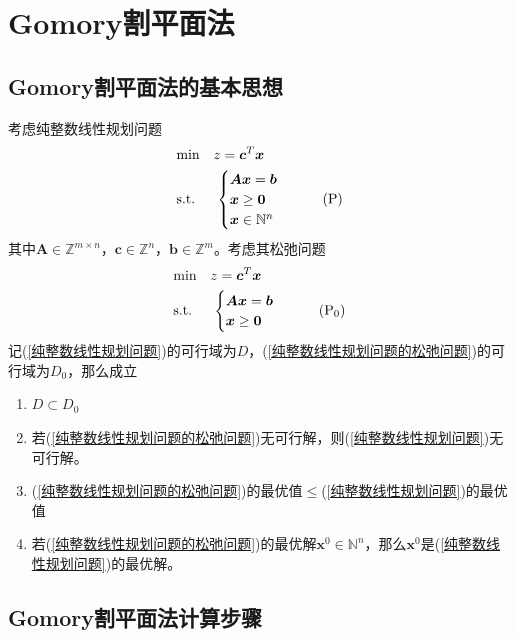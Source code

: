 \documentclass[lang = cn, scheme = chinese, thmcnt = section]{elegantbook}
\newcommand{\N}{\mathbb{N}}            %
\newcommand{\Z}{\mathbb{Z}}            %
\newcommand{\sub}{\subset}             %
\newcommand{\bs}{\boldsymbol}          %
\begin{document}
\section{Gomory割平面法}

\subsection{Gomory割平面法的基本思想}

考虑纯整数线性规划问题
\begin{align*}\label{纯整数线性规划问题}
	& \text{min}  \quad z=\bs{c}^T\bs{x}\\
	& \text{s.t.} \;\, \quad \begin{cases}
		\bs{A} \bs{x} = \bs{b}\\
		\bs{x} \ge \bs{0}\\
		\bs{x}\in\N^n
	\end{cases}\tag{$\text{P}$}
\end{align*}
其中$\bs{A}\in\Z^{m\times n}$，$\bs{c}\in \Z^n$，$\bs{b}\in \Z^m$。考虑其松弛问题
\begin{align*}\label{纯整数线性规划问题的松弛问题}
	& \text{min}  \quad z=\bs{c}^T\bs{x}\\
	& \text{s.t.} \;\, \quad \begin{cases}
		\bs{A} \bs{x} = \bs{b}\\
		\bs{x} \ge \bs{0}
	\end{cases}\tag{$\text{P}_0$}
\end{align*}
记(\ref{纯整数线性规划问题})的可行域为$D$，(\ref{纯整数线性规划问题的松弛问题})的可行域为$D_0$，那么成立
\begin{enumerate}
	\item $D\sub D_0$
	\item 若(\ref{纯整数线性规划问题的松弛问题})无可行解，则(\ref{纯整数线性规划问题})无可行解。
	\item (\ref{纯整数线性规划问题的松弛问题})的最优值$\le$(\ref{纯整数线性规划问题})的最优值
	\item 若(\ref{纯整数线性规划问题的松弛问题})的最优解$\bs{x}^0\in\N^n$，那么$\bs{x}^0$是(\ref{纯整数线性规划问题})的最优解。
\end{enumerate}

\subsection{Gomory割平面法计算步骤}
\end{document}
